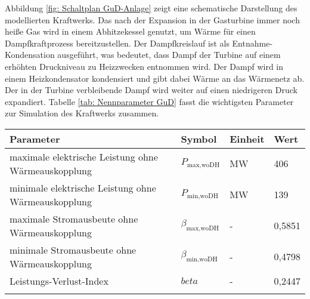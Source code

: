 Abbildung \ref{fig: Schaltplan GuD-Anlage} zeigt eine schematische Darstellung des modellierten Kraftwerks. Das nach der Expansion in der Gasturbine immer noch heiße Gas wird in einem Abhitzekessel genutzt, um Wärme für einen Dampfkraftprozess bereitzustellen. Der Dampfkreislauf ist als Entnahme-Kondensation ausgeführt, was bedeutet, dass Dampf der Turbine auf einem erhöhten Druckniveau zu Heizzwecken entnommen wird. Der Dampf wird in einem Heizkondensator kondensiert und gibt dabei Wärme an das Wärmenetz ab. Der in der Turbine verbleibende Dampf wird weiter auf einen niedrigeren Druck expandiert. Tabelle \ref{tab: Nennparameter GuD} fasst die wichtigsten Parameter zur Simulation des Kraftwerks zusammen.
	\begin{center}
		\begin{tabular}{llll}
			\hline 
			\rule{0pt}{12pt} Parameter  & Symbol  & Einheit  & Wert \tabularnewline
			\hline 
			maximale elektrische Leistung ohne Wärmeauskopplung  & $P_\text{max,woDH}$ & MW & 406  \tabularnewline
			minimale elektrische Leistung ohne Wärmeauskopplung & $P_\text{min,woDH}$ & MW & 139 \tabularnewline
			maximale Stromausbeute ohne Wärmeauskopplung &  $\beta_\text{max,woDH}$  & - & 0,5851 \tabularnewline
			minimale Stromausbeute ohne Wärmeauskopplung &  $\beta_\text{min,woDH}$  & - & 0,4798 \tabularnewline
			Leistungs-Verlust-Index &  $beta$  & - & 0,2447 \tabularnewline
			\hline
			\label{tab: Notwendige Eckdaten zur Verwendung der GenericCHP-Komponente}  &  &  & 
		\end{tabular}
	\end{center} 


